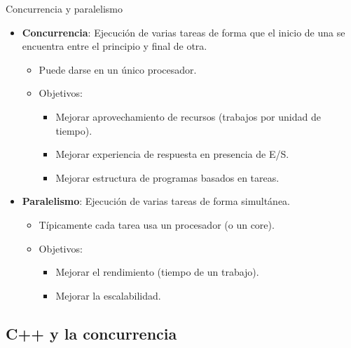 \begin{frame}[t]{Concurrencia y paralelismo}
\begin{itemize}
  \item \textbf{Concurrencia}: Ejecución de varias tareas de forma que el inicio de una
se encuentra entre el principio y final de otra.
    \begin{itemize}
      \item Puede darse en un único procesador.
      \item Objetivos:
        \begin{itemize}
          \item Mejorar aprovechamiento de recursos (trabajos por unidad de tiempo).
          \item Mejorar experiencia de respuesta en presencia de E/S.
          \item Mejorar estructura de programas basados en tareas.
        \end{itemize}
    \end{itemize}

  \vspace{12pt}
  \pause
  \item \textbf{Paralelismo}: Ejecución de varias tareas de forma simultánea.
    \begin{itemize}
      \item Típicamente cada tarea usa un procesador (o un core).
      \item Objetivos:
        \begin{itemize}
          \item Mejorar el rendimiento (tiempo de un trabajo).
          \item Mejorar la escalabilidad.
        \end{itemize}
    \end{itemize}
\end{itemize}
\end{frame}

\subsection{C++ y la concurrencia}

